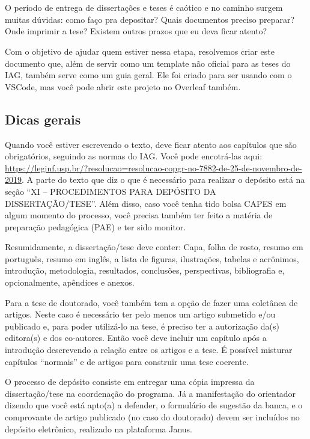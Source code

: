 \setcounter{page}{0}
\chapter{\chapternameintro}

  O período de entrega de dissertações e teses é caótico e no caminho surgem muitas dúvidas: como faço pra depositar? Quais documentos preciso preparar? Onde imprimir a tese? Existem outros prazos que eu deva ficar atento?

  Com o objetivo de ajudar quem estiver nessa etapa, resolvemos criar este documento que, além de servir como um template não oficial para as teses do IAG, também serve como um guia geral. Ele foi criado para ser usando com o VSCode, mas você pode abrir este projeto no Overleaf também.

  \section{Dicas gerais}

    Quando você estiver escrevendo o texto, deve ficar atento aos capítulos que são obrigatórios, seguindo as normas do IAG. Você pode encotrá-las aqui: \url{https://leginf.usp.br/?resolucao=resolucao-copgr-no-7882-de-25-de-novembro-de-2019}. A parte do texto que diz o que é necessário para realizar o depósito está na seção ``XI – PROCEDIMENTOS PARA DEPÓSITO DA DISSERTAÇÃO/TESE''. Além disso, caso você tenha tido bolsa CAPES em algum momento do processo, você precisa também ter feito a matéria de preparação pedagógica (PAE) e ter sido monitor.

    Resumidamente, a dissertação/tese deve conter: Capa, folha de rosto, resumo em português, resumo em inglês, a lista de figuras, ilustrações, tabelas e acrônimos, introdução, metodologia, resultados, conclusões, perspectivas, bibliografia e, opcionalmente, apêndices e anexos.

    Para a tese de doutorado, você também tem a opção de fazer uma coletânea de artigos. Neste caso é necessário ter pelo menos um artigo submetido e/ou publicado e, para poder utilizá-lo na tese, é preciso ter a autorização da(s) editora(s) e dos co-autores. Então você deve incluir um capítulo após a introdução descrevendo a relação entre os artigos e a tese. É possível misturar capítulos ``normais'' e de artigos para construir uma tese coerente.

    O processo de depósito consiste em entregar uma cópia impressa da dissertação/tese na coordenação do programa. Já a manifestação do orientador dizendo que você está apto(a) a defender, o formulário de sugestão da banca, e o comprovante de artigo publicado (no caso do doutorado) devem ser incluídos no depósito eletrônico, realizado na plataforma Janus.

